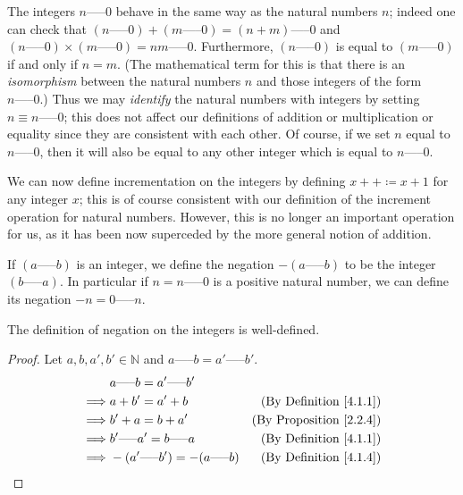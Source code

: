 \begin{note}
The integers \(n \text{-----} 0\) behave in the same way as the natural numbers \(n\);
indeed one can check that \((n \text{-----} 0) + (m \text{-----} 0) = (n + m) \text{-----} 0\) and \((n \text{-----} 0) \times (m \text{-----} 0) = nm \text{-----} 0\).
Furthermore, \((n \text{-----} 0)\) is equal to \((m \text{-----} 0)\) if and only if \(n = m\).
(The mathematical term for this is that there is an \emph{isomorphism} between the natural numbers \(n\) and those integers of the form \(n \text{-----} 0\).)
Thus we may \emph{identify} the natural numbers with integers by setting \(n \equiv n \text{-----} 0\);
this does not affect our definitions of addition or multiplication or equality since they are consistent with each other.
Of course, if we set \(n\) equal to \(n \text{-----} 0\), then it will also be equal to any other integer which is equal to \(n \text{-----} 0\).
\end{note}

\begin{note}
We can now define incrementation on the integers by defining \(x++ \coloneqq x + 1\) for any integer \(x\);
this is of course consistent with our definition of the increment operation for natural numbers.
However, this is no longer an important operation for us, as it has been now superceded by the more general notion of addition.
\end{note}

\begin{definition}\label{4.1.4}
If \((a \text{-----} b)\) is an integer, we define the negation \(-(a \text{-----} b)\) to be the integer \((b \text{-----} a)\).
In particular if \(n = n \text{-----} 0\) is a positive natural number, we can define its negation \(-n = 0 \text{-----} n\).
\end{definition}

\begin{additional corollary}\label{ac 4.1.2}
The definition of negation on the integers is well-defined.
\end{additional corollary}

\begin{proof}
Let \(a, b, a', b' \in \mathds{N}\) and \(a \text{-----} b = a' \text{-----} b'\).
\begin{align*}
& a \text{-----} b = a' \text{-----} b' \\
\implies & a + b' = a' + b & \text{(By Definition \ref{4.1.1})} \\
\implies & b' + a = b + a' & \text{(By Proposition \ref{2.2.4})} \\
\implies & b' \text{-----} a' = b \text{-----} a & \text{(By Definition \ref{4.1.1})} \\
\implies & -(a' \text{-----} b') = -(a \text{-----} b) & \text{(By Definition \ref{4.1.4})} \\
\end{align*}
\end{proof}

